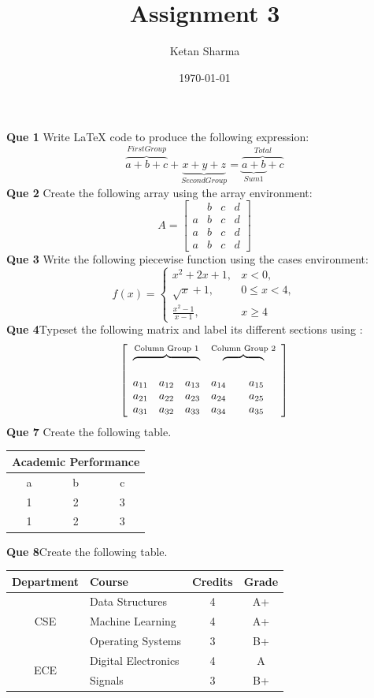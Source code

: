 \documentclass[]{article}
\begin{document}
\title{Assignment 3}
\author{Ketan Sharma}
\date{\today}
\maketitle
\textbf{Que 1}  Write LaTeX code to produce the following expression:
\[
	\overbrace{a+b+c}^{First Group}+\underbrace{x+y+z}_{Second Group}=\overbrace{\underbrace{a+b}_{Sum 1}+c}^{Total}
\]
\textbf{Que 2} Create the following array using the array environment:
	\[
		A=\left[
			\begin{array}{c|ccc}
				 &b&c&d\\ \hline
				a&b&c&d\\
				a&b&c&d\\
				a&b&c&d
			\end{array}
		\right]
	\]
\textbf{Que 3} Write the following piecewise function using the cases environment:	
	\[
		f(x)=\left\{
		\begin{array}{ll}
			x^2+2x+1,&x<0,\\
			\sqrt{x}+1,&0\leq x<4,\\
			\frac{x^2-1}{x-1},&x\geq4	
		\end{array}
		\right.
	\]
\textbf{Que 4}Typeset the following matrix and label its different sections using :
\[
\left[
\begin{array}{ccccc}
	\multicolumn{3}{c}{\overbrace{\phantom{a_{11}\quad a_{12}\quad a_{13}}}^{\text{Column Group 1}}}
	&
	\multicolumn{2}{c}{\overbrace{\phantom{a_{14}\quad a_{15}}}^{\text{Column Group 2}}}
	\\[6pt]
	a_{11} & a_{12} & a_{13} & a_{14} & a_{15}\\
	a_{21} & a_{22} & a_{23} & a_{24} & a_{25}\\
	a_{31} & a_{32} & a_{33} & a_{34} & a_{35}
\end{array}
\right]
\]
\textbf{Que 7} Create the following table.
\begin{center}
	\begin{tabular}{|c|c|c|}
		\hline
		\multicolumn{3}{|c|}{Academic Performance} \\ \hline
			a&b&c\\
			1&2&3\\
			1&2&3\\ \hline
	\end{tabular}
\end{center}
\textbf{Que 8}Create the following table.
\begin{center}
	\begin{tabular}{|c|l|c|c|}
		\hline
		Department&Course&Credits&Grade\\
		\hline
		\multirow{3}{*}{CSE}
		&Data Structures & 4&A+\\
		&Machine Learning&4&A+\\
		&Operating Systems&3&B+\\ \hline
		\multirow{2}{*}{ECE}
		&Digital Electronics &4&A\\
		&Signals&3&B+\\ \hline
	\end{tabular}
\end{center}
\end{document}
